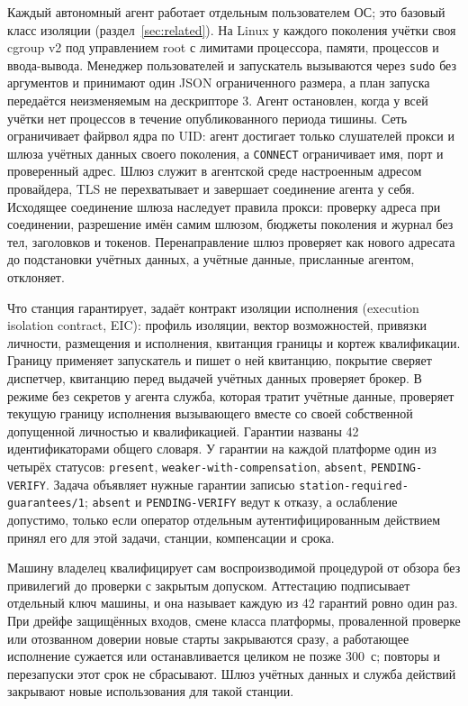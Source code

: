 \documentclass[10pt,a4paper]{article}
\begin{document}
Каждый автономный агент работает отдельным пользователем ОС; это базовый класс изоляции (раздел~\ref{sec:related}). На Linux у каждого поколения учётки своя cgroup v2 под управлением root с лимитами процессора, памяти, процессов и ввода-вывода. Менеджер пользователей и запускатель вызываются через \texttt{sudo} без аргументов и принимают один JSON ограниченного размера, а план запуска передаётся неизменяемым на дескрипторе 3. Агент остановлен, когда у всей учётки нет процессов в течение опубликованного периода тишины. Сеть ограничивает файрвол ядра по UID: агент достигает только слушателей прокси и шлюза учётных данных своего поколения, а \texttt{CONNECT} ограничивает имя, порт и проверенный адрес. Шлюз служит в агентской среде настроенным адресом провайдера, TLS не перехватывает и завершает соединение агента у себя. Исходящее соединение шлюза наследует правила прокси: проверку адреса при соединении, разрешение имён самим шлюзом, бюджеты поколения и журнал без тел, заголовков и токенов. Перенаправление шлюз проверяет как нового адресата до подстановки учётных данных, а учётные данные, присланные агентом, отклоняет.

Что станция гарантирует, задаёт контракт изоляции исполнения (execution isolation contract, EIC): профиль изоляции, вектор возможностей, привязки личности, размещения и исполнения, квитанция границы и кортеж квалификации. Границу применяет запускатель и пишет о ней квитанцию, покрытие сверяет диспетчер, квитанцию перед выдачей учётных данных проверяет брокер. В режиме без секретов у агента служба, которая тратит учётные данные, проверяет текущую границу исполнения вызывающего вместе со своей собственной допущенной личностью и квалификацией. Гарантии названы 42 идентификаторами общего словаря. У гарантии на каждой платформе один из четырёх статусов: \texttt{present}, \texttt{weaker-with-compensation}, \texttt{absent}, \texttt{PENDING-VERIFY}. Задача объявляет нужные гарантии записью \texttt{station-required-guarantees/1}; \texttt{absent} и \texttt{PENDING-VERIFY} ведут к отказу, а ослабление допустимо, только если оператор отдельным аутентифицированным действием принял его для этой задачи, станции, компенсации и срока.

Машину владелец квалифицирует сам воспроизводимой процедурой от обзора без привилегий до проверки с закрытым допуском. Аттестацию подписывает отдельный ключ машины, и она называет каждую из 42 гарантий ровно один раз. При дрейфе защищённых входов, смене класса платформы, проваленной проверке или отозванном доверии новые старты закрываются сразу, а работающее исполнение сужается или останавливается целиком не позже 300~с; повторы и перезапуски этот срок не сбрасывают. Шлюз учётных данных и служба действий закрывают новые использования для такой станции.
\end{document}
